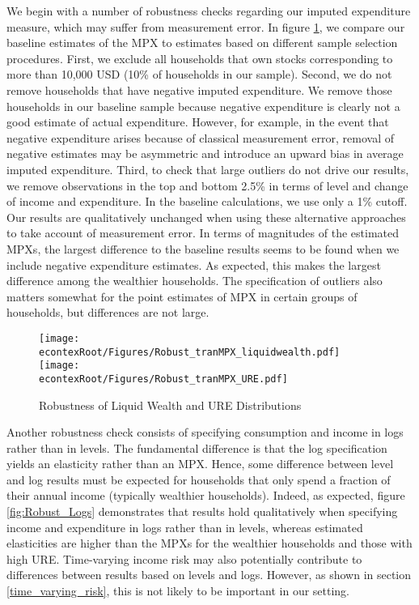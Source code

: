 \documentclass[titlepage]{\econtex}\newcommand{\texname}{ConsumptionHeterogeneity}
\begin{document}
We begin with a number of robustness checks regarding our imputed expenditure measure, which may suffer from measurement error. In figure \ref{fig:Robust_liquidURE}, we compare our baseline estimates of the MPX to estimates based on different sample selection procedures. First, we exclude all households that own stocks corresponding to more than 10,000 USD (10\% of households in our sample). Second, we do not remove households that have negative imputed expenditure. We remove those households in our baseline sample because negative expenditure is clearly not a good estimate of actual expenditure. However, for example, in the event that negative expenditure arises because of classical measurement error, removal of negative estimates may be asymmetric and introduce an upward bias in average imputed expenditure. Third, to check that large outliers do not drive our results, we remove observations in the top and bottom 2.5\% in terms of level and change of income and expenditure. In the baseline calculations, we use only a 1\% cutoff. Our results are qualitatively unchanged when using these alternative approaches to take account of measurement error. In terms of magnitudes of the estimated MPXs, the largest difference to the baseline results seems to be found when we include negative expenditure estimates. As expected, this makes the largest difference among the wealthier households. The specification of outliers also matters somewhat for the point estimates of MPX in certain groups of households, but differences are not large. 

\begin{figure}
	\begin{centering}
		\texttt{[image: \\econtexRoot/Figures/Robust\_tranMPX\_liquidwealth.pdf]}
		\texttt{[image: \\econtexRoot/Figures/Robust\_tranMPX\_URE.pdf]}
		\caption{Robustness of Liquid Wealth and URE Distributions}
		\label{fig:Robust_liquidURE}
	\end{centering}
\end{figure}

Another robustness check consists of specifying consumption and income in logs rather than in levels. The fundamental difference is that the log specification yields an elasticity rather than an MPX. Hence, some difference between level and log results must be expected for households that only spend a fraction of their annual income (typically wealthier households). Indeed, as expected, figure \ref{fig:Robust_Logs} demonstrates that results hold qualitatively when specifying income and expenditure in logs rather than in levels, whereas estimated elasticities are higher than the MPXs for the wealthier households and those with high URE. Time-varying income risk may also potentially contribute to differences between results based on levels and logs. However, as shown in section \ref{time_varying_risk}, this is not likely to be important in our setting.  
\end{document}
